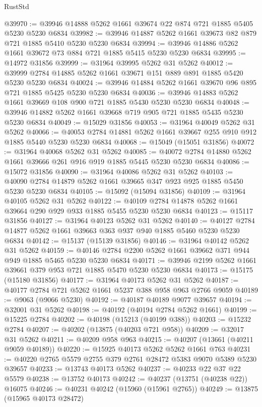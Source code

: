 \begin{lexlean}{RustStd}
\begin{coremodule}
@39970 := @39946 @14888 @5262 @1661 @39674 @22 @874 @721 @1885 @5405 @5230 @5230 @6834
@39982 := @39946 @14887 @5262 @1661 @39673 @82 @879 @721 @1885 @5410 @5230 @5230 @6834
@39994 := @39946 @14886 @5262 @1661 @39672 @73 @884 @721 @1885 @5415 @5230 @5230 @6834
@39995 := @14972 @31856
@39999 := @31964 @39995 @5262 @31 @5262
@40012 := @39999 @2784 @14885 @5262 @1661 @39671 @151 @889 @891 @1885 @5420 @5230 @5230 @6834
@40024 := @39946 @14884 @5262 @1661 @39670 @96 @895 @721 @1885 @5425 @5230 @5230 @6834
@40036 := @39946 @14883 @5262 @1661 @39669 @108 @900 @721 @1885 @5430 @5230 @5230 @6834
@40048 := @39946 @14882 @5262 @1661 @39668 @719 @905 @721 @1885 @5435 @5230 @5230 @6834
@40049 := @15029 @31856
@40053 := @31964 @40049 @5262 @31 @5262
@40066 := @40053 @2784 @14881 @5262 @1661 @39667 @255 @910 @912 @1885 @5440 @5230 @5230 @6834
@40068 := @15049 (@15051 @31856)
@40072 := @31964 @40068 @5262 @31 @5262
@40085 := @40072 @2784 @14880 @5262 @1661 @39666 @261 @916 @919 @1885 @5445 @5230 @5230 @6834
@40086 := @15072 @31856
@40090 := @31964 @40086 @5262 @31 @5262
@40103 := @40090 @2784 @14879 @5262 @1661 @39665 @347 @923 @925 @1885 @5450 @5230 @5230 @6834
@40105 := @15092 (@15094 @31856)
@40109 := @31964 @40105 @5262 @31 @5262
@40122 := @40109 @2784 @14878 @5262 @1661 @39664 @290 @929 @933 @1885 @5455 @5230 @5230 @6834
@40123 := @15117 @31856
@40127 := @31964 @40123 @5262 @31 @5262
@40140 := @40127 @2784 @14877 @5262 @1661 @39663 @363 @937 @940 @1885 @5460 @5230 @5230 @6834
@40142 := @15137 (@15139 @31856)
@40146 := @31964 @40142 @5262 @31 @5262
@40159 := @40146 @2784 @2200 @5262 @1661 @39662 @371 @944 @949 @1885 @5465 @5230 @5230 @6834
@40171 := @39946 @2199 @5262 @1661 @39661 @379 @953 @721 @1885 @5470 @5230 @5230 @6834
@40173 := @15175 (@15180 @31856)
@40177 := @31964 @40173 @5262 @31 @5262
@40187 := @40177 @2784 @721 @5262 @1661 @5237 @388 @958 @963 @2766 @9059
@40189 := @9063 (@9066 @5230)
@40192 := @40187 @40189 @9077 @39657
@40194 := @32001 @31 @5262
@40198 := @40192 (@40194 @2784 @5262 @1661)
@40199 := @15225 @2784
@40202 := @40198 (@15213 (@40199 @388))
@40203 := @15232 @2784
@40207 := @40202 (@13875 (@40203 @721 @958))
@40209 := @32017 @31 @5262
@40211 := @40209 @958 @963
@40215 := @40207 (@13661 (@40211 @9059 @40189))
@40220 := @15925 @40173 @5262 @5262 @1661 @763
@40231 := @40220 @2765 @5579 @2755 @379 @2761 @28472 @5383 @9070 @5389 @5230 @39657
@40233 := @13743 @40173 @5262
@40237 := @40233 @22 @37 @22 @5579
@40238 := @13752 @40173
@40242 := @40237 (@13751 (@40238 @22)) @16075
@40246 := @40231 @40242 (@15960 (@15961 @2765))
@40249 := @13875 (@15965 @40173 @28472)

\end{coremodule}
\end{lexlean}
